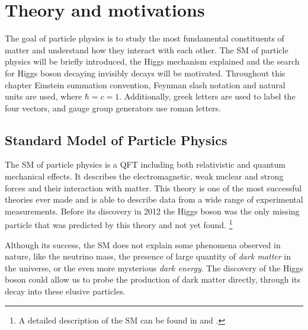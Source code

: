 \chapter{Theory and motivations}
\label{CHAPTER:TheoryAndMotivations}

\glsresetall %


The goal of particle physics is to study the most fundamental constituents of matter and understand how they interact with each other. The \gls{SM} of particle physics will be briefly introduced, the Higgs mechanism explained and the search for Higgs boson decaying invisibly decays will be motivated. Throughout this chapter Einstein summation convention, Feynman slash notation and natural units are used, where $\hbar=c=1$. Additionally, greek letters are used to label the four vectors, and gauge group generators use roman letters.

\section{Standard Model of Particle Physics}


The \gls{SM} of particle physics is a \gls{QFT} including both relativistic and quantum mechanical effects. It describes the electromagnetic, weak nuclear and strong forces and their interaction with matter. This theory is one of the most successful theories ever made and is able to describe data from a wide range of experimental measurements. Before its discovery in 2012 \cite{ARTICLE:ATLAS_HiggsDiscovery,ARTICLE:CMS_HiggsDiscovery} the Higgs boson was the only missing particle that was predicted by this theory and not yet found. \footnote{A detailed description of the \gls{SM} can be found in \cite{BOOK:Griffiths} and \cite{BOOK:halzen1984quarks}.}

Although its success, the \gls{SM} does not explain some phenomena observed in nature, like the neutrino mass, the presence of large quantity of \textit{dark matter} in the universe, or the even more mysterious \textit{dark energy}. The discovery of the Higgs boson could allow us to probe the production of dark matter directly, through its decay into these elusive particles. 

